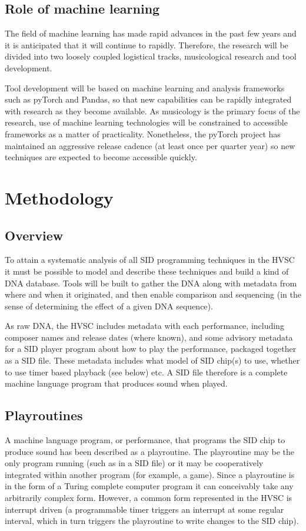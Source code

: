 \documentclass[10pt]{article}
\begin{document}
\begin{multicols*}{2}
  \subsection{Role of machine learning}
  The field of machine learning has made rapid advances in the past
  few years and it is anticipated that it will continue to
  rapidly. Therefore, the research will be divided into two loosely
  coupled logistical tracks, musicological research and tool
  development.

  Tool development will be based on machine learning and
  analysis frameworks such as pyTorch and Pandas, so that new
  capabilities can be rapidly integrated with research as they become
  available. As musicology is the primary focus of the research,
  use of machine learning technologies will be constrained to
  accessible frameworks as a matter of practicality. Nonetheless,
  the pyTorch project has maintained an aggressive release cadence
  (at least once per quarter year) so new techniques are expected
  to become accessible quickly.

  \section{Methodology}

  \subsection{Overview}
  To attain a systematic analysis of all SID programming techniques
  in the HVSC it must be possible to model and describe these
  techniques and build a kind of DNA database. Tools will be built
  to gather the DNA along with metadata from where and when it
  originated, and then enable comparison and sequencing (in
  the sense of determining the effect of a given DNA sequence).

  As raw DNA, the HVSC includes metadata with each performance,
  including composer names and release dates (where known), and some
  advisory metadata for a SID player program about how to play the
  performance, packaged together as a SID file. These metadata
  includes what model of SID chip(s) to use, whether to use timer
  based playback (see below) etc. A SID file therefore is a complete
  machine language program that produces sound when played.

  \subsection{Playroutines}
  A machine language program, or performance, that programs the SID
  chip to produce sound has been described as a playroutine.  The
  playroutine may be the only program running (such as in a SID file)
  or it may be cooperatively integrated within another program (for
  example, a game). Since a playroutine is in the form of a Turing
  complete computer program it can conceivably take any arbitrarily
  complex form. However, a common form represented in the HVSC is
  interrupt driven (a programmable timer triggers an interrupt at some
  regular interval, which in turn triggers the playroutine to write
  changes to the SID chip).


\end{multicols*}
\end{document}
